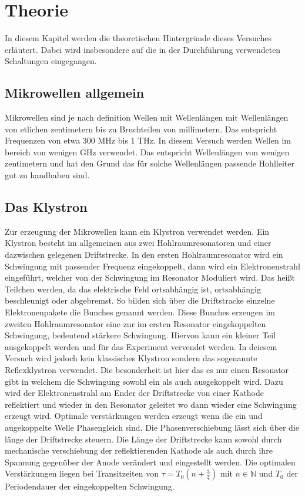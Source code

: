 \section{Theorie} 
\label{sec:Theorie}

In diesem Kapitel werden die theoretischen Hintergründe dieses Versuches erläutert. Dabei wird insbesondere auf die in der Durchführung verwendeten Schaltungen eingegangen.

\subsection{Mikrowellen allgemein}
\label{sec:thallgemein}
Mikrowellen sind je nach definition Wellen mit Wellenlängen mit Wellenlängen von etlichen zentimetern bis
zu Bruchteilen von millimetern. Das entspricht Frequenzen von etwa 300 MHz bis 1 THz. In diesem Versuch werden
Wellen im bereich von wenigen GHz verwendet. Das entspricht Wellenlängen von wenigen zentimetern und hat den
Grund das für solche Wellenlängen passende Hohlleiter gut zu handhaben sind.

\subsection{Das Klystron}
\label{sec:thklystron}
Zur erzeugung der Mikrowellen kann ein Klystron verwendet werden. Ein Klystron besteht im allgemeinen 
aus zwei Hohlraumresonatoren und einer dazwischen gelegenen Driftstrecke. In den ersten Hohlraumresonator 
wird ein Schwingung mit passender Frequenz eingekoppelt, dann wird ein Elektronenstrahl eingeführt, welcher 
von der Schwingung im Resonator Moduliert wird. Das heißt Teilchen werden, da das elektrische Feld ortsabhängig
ist, ortsabhängig beschleunigt oder abgebremst. So bilden sich über die Driftstracke 
einzelne Elektronenpakete die Bunches genannt werden. Diese Bunches erzeugen im zweiten Hohlraumresonator eine
zur im ersten Resonator eingekoppelten Schwingung, bedeutend stärkere Schwingung. Hiervon kann ein kleiner Teil 
ausgekoppelt werden und für das Experiment vervendet werden. In deiesem Versuch wird jedoch kein klassisches
Klystron sondern das sogenannte Reflexklystron verwendet. Die besonderheit ist hier das es nur einen Resonator 
gibt in welchem die Schwingung sowohl ein als auch ausgekoppelt wird. Dazu wird der Elektronenstrahl am Ender der 
Driftstrecke von einer Kathode reflektiert und wieder in den Resonator geleitet wo dann wieder eine Schwingung
erzeugt wird. Optimale verstärkungen werden erzeugt wenn die ein und augekoppelte Welle Phasengleich sind. 
Die Phasenverschiebung lässt sich über die länge der Driftstrecke steuern. Die Länge der Driftstrecke kann 
sowohl durch mechanische verschiebung der reflektierenden Kathode als auch durch ihre Spannung gegenüber 
der Anode verändert und eingestellt werden. Die optimalen Verstärkungen liegen bei Transitzeiten von
$\tau=T_0(n+\frac{3}{4})$ mit $n \in \mathbb{N}$ und $T_0$ der Periodendauer der eingekoppelten Schwingung.

